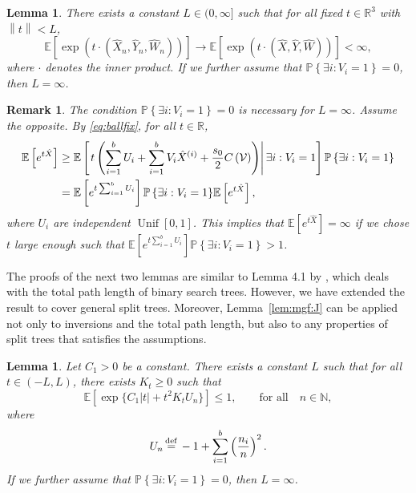 \documentclass[11pt]{article}
\newcommand{\E}[1]{\mathbb{E} \left[#1\right]}
\newcommand{\norm}[1]{\left\lVert#1\right\rVert}
\newcommand{\ball}[1]{\hat{#1}}
\def\bX{\ball{X}}
\def\bY{\ball{Y}}
\def\bW{\ball{W}}
\newcommand{\bVec}{(\bX, \bY, \bW)}
\newcommand{\bVecN}{(\bX_n, \bY_n, \bW_n)}
\newcommand\cV{{\cal V}}
\def\R{\mathbb{R}}
\def\N{\mathbb{N}}
\newcommand\Prob[1]{{\mathbb{P}\left\{#1\right\}}}
\numberwithin{theorem}{section}
\newtheorem{lemma}[theorem]{Lemma}
\newcommand{\bfrac}[2]{\left({\frac{#1}{#2}}\right)}
\newtheorem{remark}[theorem]{Remark}
\theoremstyle{definition}
\newcommand{\eqd}{\,{\buildrel {\mathrm{def}} \over =}\,}
\newcommand{\Unif}{\mathop{\mathrm{Unif}}}
\numberwithin{equation}{section}
\newcommand{\refL}[1]{Lemma~\ref{#1}}
\begin{document}
\begin{lemma}\label{lem:mgflem}
    There exists a constant \(L \in (0, \infty]\) such that for all fixed $t \in \R^3$ with
    \(\norm{t} < L\),
\begin{equation}
\label{eq:mgflem}      
    \E{\exp\left(t \cdot \bVecN \right)} 
    \to 
    \E{\exp\left(t \cdot \bVec \right)} < \infty,
\end{equation}
    where \(\cdot\) denotes the inner product.
    If we further assume that \(\Prob{\exists i:V_i=1}=0\), then \(L = \infty\).
\end{lemma}

\begin{remark}
    The condition \(\Prob{\exists i:V_i=1}=0\) is necessary for \(L=\infty\). Assume the opposite. By
    \eqref{eq:ballfix}, for all \(t \in \R\),
    \begin{align*}
        \E{e^{t \bX}} 
        &
        \ge 
        \E{
            \left.
            t
            \left( 
                \sum_{i=1}^{b} U_{i}
                +
                \sum_{i=1}^{b} V_{i} \bX^{(i)}
                +
                \frac{s_0}{2}
                C\left( \cV \right)
            \right) \right|
            \exists i:V_i=1
        }
        \Prob{\exists i:V_i=1}
        \\
        &
        =
        \E{e^{t \sum_{i=1}^b U_{i}}}
        \Prob{\exists i:V_i=1}
        \E{e^{t \bX}}
        ,
    \end{align*}
    where \(U_{i}\) are independent \(\Unif[0,1]\).
    This implies that \(\E{e^{t \bX}} = \infty\) if we 
    chose \(t\) large enough such that \(\E{e^{t \sum_{i=1}^b U_{i}}} \Prob{\exists i:V_i=1} > 1\).
\end{remark}

The proofs of the next two lemmas are similar to Lemma 4.1 by \citet{MR1104413}, which deals with the
total path length of binary search trees.  However, we have extended the result to cover general
split trees.  Moreover, \refL{lem:mgf:J} can be applied not only to
inversions and the total path length, but also to any properties of split trees that satisfies the
assumptions.

\begin{lemma}
    \label{lem:U:bound}
    Let \(C_1 > 0\) be a constant.
    There exists a constant \(L\) such that for all \(t \in (-L,L)\), there exists \(K_{t} \ge 0\)
    such that
    \begin{equation}
        \E{\exp\{C_1 |t| + t^2 K_t U_n\}}
        \le 1,
        \qquad
        \text{for all}
        \quad
        n \in \N,
        \label{eq:fbound}
    \end{equation}
    where
    \[
        U_n \eqd -1 + \sum_{i=1}^b \bfrac{n_i}{n}^2.
    \]
    If we further assume that \(\Prob{\exists i:V_i=1}=0\), then \(L = \infty\).
\end{lemma}
\end{document}

